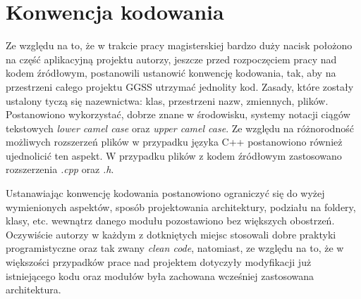 \section{Konwencja kodowania}
Ze względu na to, że w trakcie pracy magisterskiej bardzo duży nacisk położono na część aplikacyjną projektu autorzy, jeszcze przed rozpoczęciem pracy nad kodem źródłowym, postanowili ustanowić konwencję kodowania, tak, aby na przestrzeni całego projektu GGSS utrzymać jednolity kod. Zasady, które zostały ustalony tyczą się nazewnictwa: klas, przestrzeni nazw, zmiennych, plików. Postanowiono wykorzystać, dobrze znane w środowisku, systemy notacji ciągów tekstowych \emph{lower camel case} oraz \emph{upper camel case}. Ze względu na różnorodność możliwych rozszerzeń plików w przypadku języka C++ postanowiono również ujednolicić ten aspekt. W przypadku plików z kodem źródłowym zastosowano rozszerzenia \emph{.cpp} oraz \emph{.h}. %

Ustanawiając konwencję kodowania postanowiono ograniczyć się do wyżej wymienionych aspektów, sposób projektowania architektury, podziału na foldery, klasy, etc. wewnątrz danego modułu pozostawiono bez większych obostrzeń. Oczywiście autorzy w każdym z dotkniętych miejsc stosowali dobre praktyki programistyczne oraz tak zwany \emph{clean code}, natomiast, ze względu na to, że w większości przypadków prace nad projektem dotyczyły modyfikacji już istniejącego kodu oraz modułów była zachowana wcześniej zastosowana architektura.

